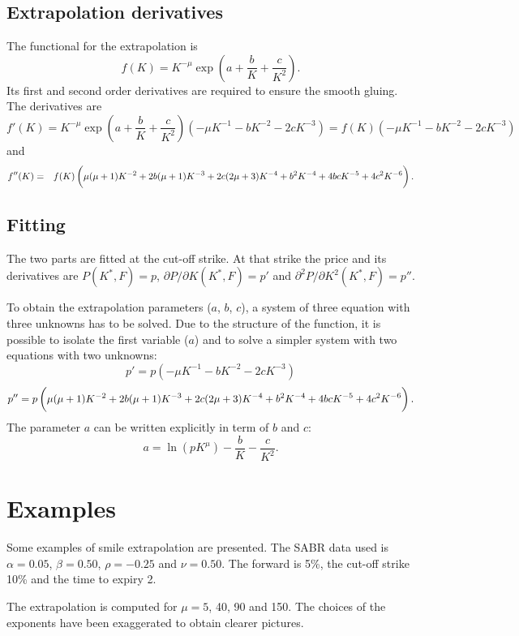 \documentclass[]{amsart}
\begin{document}
\subsection{Extrapolation derivatives}
The functional for the extrapolation is
\[
f(K) = K^{-\mu} \exp\left( a + \frac{b}{K} + \frac{c}{K^2} \right).
\]
Its first and second order derivatives are required to ensure the smooth gluing. The derivatives are
\[
f'(K) = K^{-\mu} \exp\left( a + \frac{b}{K} + \frac{c}{K^2} \right) (-\mu K^{-1} - bK^{-2}-2cK^{-3}) = f(K)(-\mu K^{-1} - bK^{-2}-2cK^{-3})
\]
and
\begin{eqnarray*}
f''(K) & = & f(K) \left(\vphantom{\int} \mu(\mu+1)K^{-2}+2b(\mu+1)K^{-3}+2c(2\mu+3)K^{-4} + b^2 K^{-4} + 4bc K^{-5} + 4 c^2K^{-6} \right).
\end{eqnarray*}

\subsection{Fitting}

The two parts are fitted at the cut-off strike. At that strike the price and its derivatives are $P(K^*,F) = p$, $\partial P/\partial K(K^*,F) = p'$ and $\partial^2 P/\partial K^2(K^*,F) = p''$.

To obtain the extrapolation parameters ($a$, $b$, $c$), a system of three equation with three unknowns has to be solved. Due to the structure of the function, it is possible to isolate the first variable ($a$) and to solve a simpler system with two equations with two unknowns:
\[
p' = p\left(-\mu K^{-1} - bK^{-2}-2cK^{-3}\right)
\]
\[
p'' = p \left(\vphantom{\int} \mu(\mu+1)K^{-2}+2b(\mu+1)K^{-3}+2c(2\mu+3)K^{-4} + b^2 K^{-4} + 4bc K^{-5} + 4 c^2K^{-6} \right).
\]
The parameter $a$ can be written explicitly in term of $b$ and $c$:
\[
a = \ln(p K^{\mu}) - \frac{b}{K} - \frac{c}{K^2}.
\]

\section{Examples}

Some examples of smile extrapolation are presented. The SABR data used is $\alpha=0.05$, $\beta=0.50$, $\rho=-0.25$ and $\nu=0.50$. The forward is 5\%, the cut-off strike 10\% and the time to expiry 2. 

The extrapolation is computed for $\mu=5$, 40, 90 and 150. The choices of the exponents have been exaggerated to obtain clearer pictures.

\end{document}
